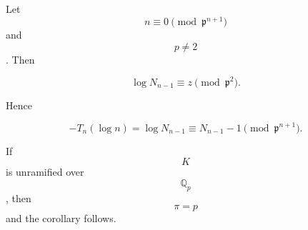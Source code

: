 Let $$n \equiv 0 \pmod{\mathfrak{p}^{n+1}}$$ and $$p \neq 2$$. Then

$$\log N_{n-1} \equiv z \pmod{\mathfrak{p}^2}.$$

Hence

$$-T_n(\log n) = \log N_{n-1} \equiv N_{n-1} - 1 \pmod{\mathfrak{p}^{n+1}}.$$

If $$K$$ is unramified over $$\mathbb{Q}_p$$, then $$\pi = p$$ and the corollary follows.
